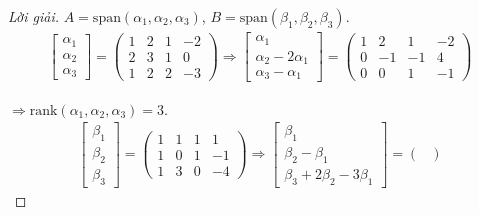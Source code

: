 \documentclass[class=linearalgebra,crop=false]{standalone}
\begin{document}
\begin{proof}[Lời giải]$A = \text{span}(\alpha_{1},\alpha_{2},\alpha_{3})$, $B = \text{span}(\beta_{1},\beta_{2},\beta_{3})$.
    \begin{align*}
        \begin{bmatrix}
            \alpha_{1} \\
            \alpha_{2} \\
            \alpha_{3}
        \end{bmatrix}=
        \begin{pmatrix}
            1 & 2 & 1 & -2 \\
            2 & 3 & 1 & 0 \\
            1 & 2 & 2 & -3
        \end{pmatrix}
        \Longrightarrow
        \begin{bmatrix}
            \alpha_{1} \\
            \alpha_{2} - 2\alpha_{1} \\
            \alpha_{3} - \alpha_{1}
        \end{bmatrix}=
        \begin{pmatrix}
            1 & 2 & 1 & -2 \\
            0 & -1 & -1 & 4 \\
            0 & 0 & 1 & -1
        \end{pmatrix}
    \end{align*}
    \par $\Rightarrow\text{rank}(\alpha_{1}, \alpha_{2}, \alpha_{3}) = 3$.
    \begin{align*}
        \begin{bmatrix}
            \beta_{1} \\
            \beta_{2} \\
            \beta_{3}
        \end{bmatrix}=
        \begin{pmatrix}
            1 & 1 & 1 & 1 \\
            1 & 0 & 1 & -1 \\
            1 & 3 & 0 & -4
        \end{pmatrix}
        \Longrightarrow
        \begin{bmatrix}
            \beta_{1} \\
            \beta_{2} - \beta_{1} \\
            \beta_{3} + 2\beta_{2} - 3\beta_{1}
        \end{bmatrix}=
        \begin{pmatrix}

\end{pmatrix}
\end{align*}
\end{proof}
\end{document}

